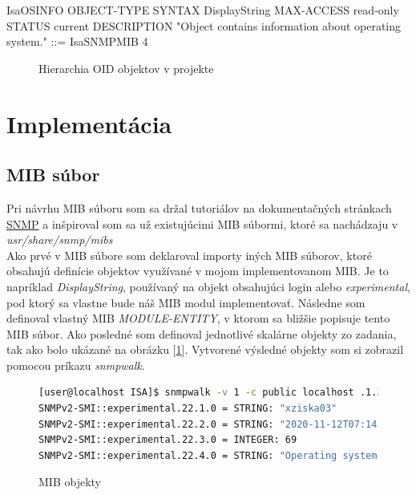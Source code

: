 \documentclass{article}
\begin{document}
    \begin{verbbox}
IsaOSINFO OBJECT-TYPE
SYNTAX      DisplayString
MAX-ACCESS  read-only
STATUS      current
DESCRIPTION
"Object contains information about operating system."
::= { IsaSNMPMIB 4 }
    \end{verbbox}
    \begin{figure}[!htb]
        \centering
        \theverbbox
        \caption{Hierarchia OID objektov v projekte}
        \label{MIBobjekt}
    \end{figure}
    
    \vspace{1cm}
	\section{Implementácia}
	\subsection{MIB súbor}
	Pri návrhu MIB súboru som sa držal tutoriálov na dokumentačných stránkach \href{http://www.net-snmp.org/wiki/index.php/Tutorials}{SNMP} a inšpiroval som sa už existujúcimi MIB súbormi, ktoré sa nachádzaju v \textit{usr/share/snmp/mibs} 
	\\
	Ako prvé v MIB súbore som deklaroval importy iných MIB súborov, ktoré obsahujú definície objektov využívané v mojom implementovanom MIB. Je to napríklad \textit{DisplayString}, používaný na objekt obsahujúci login alebo \textit{experimental}, pod ktorý sa vlastne bude náš MIB modul implementovať. Následne som definoval vlastný MIB \textit{MODULE-ENTITY}, v ktorom sa bližšie popisuje tento MIB súbor. Ako posledné som definoval jednotlivé skalárne objekty zo zadania, tak ako bolo ukázané na obrázku [\ref{MIBobjekt}]. Vytvorené výsledné objekty som si zobrazil pomocou príkazu \textit{snmpwalk}.
	\begin{figure}[!htb]
	    \begin{lstlisting}[language=bash]
[user@localhost ISA]$ snmpwalk -v 1 -c public localhost .1.3.6.1.3.22
SNMPv2-SMI::experimental.22.1.0 = STRING: "xziska03"
SNMPv2-SMI::experimental.22.2.0 = STRING: "2020-11-12T07:14:52+05:00"
SNMPv2-SMI::experimental.22.3.0 = INTEGER: 69
SNMPv2-SMI::experimental.22.4.0 = STRING: "Operating system is Linux!"
        \end{lstlisting}
        \label{MIBcontent}
        \caption{MIB objekty}
    \end{figure}
   \vspace{1cm}
\end{document}
